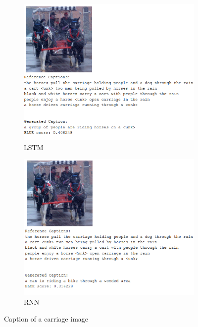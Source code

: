 \documentclass{article}
\begin{document}
    \newpage


    \begin{figure}[h!]
        \centering
        \begin{subfigure}[t]{0.4\textwidth}
            \centering
            \includegraphics[width=1\textwidth]{lstm_horse.PNG}
            \caption{LSTM}
            \label{figc:figa}
        \end{subfigure}
        \begin{subfigure}[t]{0.4\textwidth}
            \centering
            \includegraphics[width=1\textwidth]{rnn_horse.PNG}
            \caption{RNN}
            \label{figc:figb}
        \end{subfigure}
        \caption{Caption of a carriage image}
        \label{figd}
    \end{figure}
\end{document}

